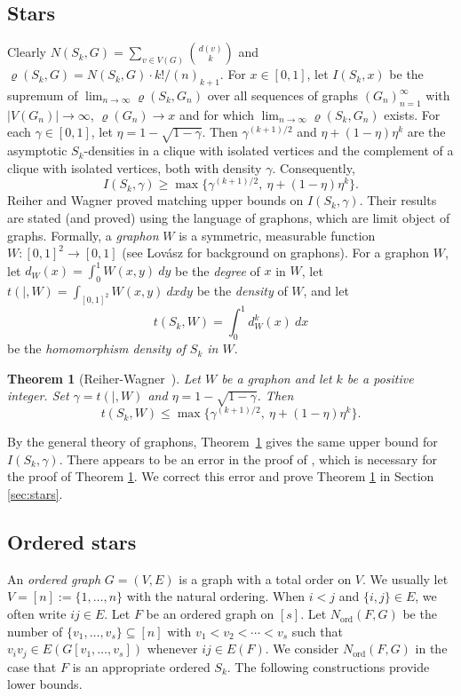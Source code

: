 \documentclass[11pt]{article}
\newtheorem{thm}{Theorem}[section]
\newcommand{\ord}{{\operatorname{ord}}}
\theoremstyle{definition}
\begin{document}
\subsection{Stars}
Clearly $N(S_k, G) = \sum_{v \in V(G)} \binom{d(v)}{k}$ and $\varrho (S_k, G) = N (S_k, G) \cdot k! / (n)_{k+1}.$
For $x \in [0,1]$, let $I(S_k,x)$ be the supremum of $\lim_{n \to \infty} \varrho (S_k, G_n)$ over all sequences of graphs $(G_n)_{n=1}^{\infty}$ with $|V(G_n)|\rightarrow \infty$, $\varrho(G_n)\rightarrow x$ and for which $\lim_{n \to \infty} \varrho (S_k, G_n)$ exists.  
For each $\gamma \in [0,1]$, let $\eta=1 - \sqrt{1 - \gamma}$. Then $\gamma^{(k + 1) / 2}$ and $\eta + (1 - \eta) \eta^k$ are  the asymptotic $S_k$-densities in a clique with isolated vertices and the complement of a clique with isolated vertices, both with density $\gamma$. Consequently, 
\[ I(S_k, \gamma) \ge \max \{ \gamma^{(k + 1) / 2},~ \eta + (1 - \eta) \eta^k \}. \]
Reiher and Wagner \cite{RW} proved matching upper bounds on $I(S_k, \gamma)$. Their results are stated (and proved) using the language of graphons, which are limit object of graphs. Formally, a {\em graphon} $W$ is a symmetric, measurable function $W: [0,1]^2 \to [0,1]$   (see Lov\'{a}sz \cite{L} for  background on graphons). For a graphon $W$, let $d_W (x) = \int_0^1 W(x,y) ~dy$ be the {\em degree} of $x$ in $W$, let $t (|, W) = \int_{[0,1]^2} W(x, y) ~dx dy$ be the {\em density} of $W$, and let \[ t (S_k, W) = \int_0^1 d_W^k (x) ~dx \] be the {\em homomorphism density of $S_k$ in $W$}.
\begin{thm} [Reiher-Wagner~\cite{RW}] \label{thm:RW}
    Let $W$ be a graphon and let $k$ be a positive integer. Set $\gamma = t(|, W)$ and $\eta = 1 - \sqrt{1 - \gamma}$. Then \[ t (S_k, W) \le \max \{\gamma^{(k + 1) / 2},~ \eta + (1 - \eta) \eta^k \}. \]
\end{thm}
By the general theory of graphons, Theorem~\ref{thm:RW} gives the same upper bound for $I(S_k, \gamma)$.
There appears to be an error in the proof of \cite[Proposition 3.7]{RW}, which is necessary for the proof of Theorem \ref{thm:RW}. We correct this error and prove Theorem \ref{thm:RW} in Section \ref{sec:stars}.

\subsection{Ordered stars}

 An {\em ordered graph} $G = (V, E)$ is a graph with a total order on $V$. We usually let $V= [n]:=\{1, \ldots, n\}$ with the natural ordering.  When $i<j$ and $\{i,j\} \in E$, we often write $ij \in E$. Let $F$ be an ordered graph on $[s]$. Let $N_{\ord} (F, G)$ be the number of $\{ v_1, \ldots, v_s \} \subseteq [n]$ with $v_1 < v_2 < \cdots < v_s$ such that $v_i v_j \in E (G [v_1, \ldots, v_s])$ whenever $ij \in E(F)$. We consider $N_{\ord} (F, G)$ in the case that $F$ is an appropriate ordered $S_k$. The following constructions provide lower bounds.
 
\end{document}
